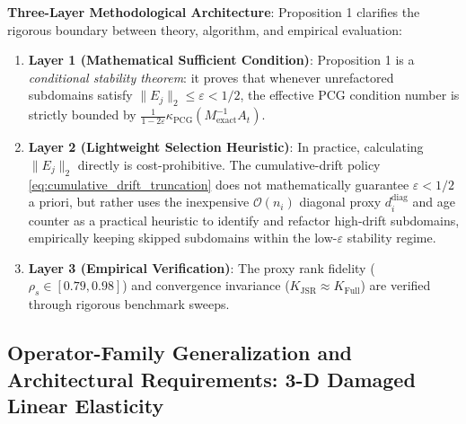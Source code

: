 \documentclass[preprint,12pt,3p]{elsarticle}
\begin{document}
\noindent\textbf{Three-Layer Methodological Architecture}:
Proposition 1 clarifies the rigorous boundary between theory, algorithm, and empirical evaluation:
\begin{enumerate}
    \item \textbf{Layer 1 (Mathematical Sufficient Condition)}: Proposition 1 is a \textit{conditional stability theorem}: it proves that whenever unrefactored subdomains satisfy $\|E_j\|_2 \le \varepsilon < 1/2$, the effective PCG condition number is strictly bounded by $\frac{1}{1-2\varepsilon} \kappa_{\text{PCG}}(M_{\text{exact}}^{-1} A_t)$.
    \item \textbf{Layer 2 (Lightweight Selection Heuristic)}: In practice, calculating $\|E_j\|_2$ directly is cost-prohibitive. The cumulative-drift policy \eqref{eq:cumulative_drift_truncation} does not mathematically guarantee $\varepsilon < 1/2$ a priori, but rather uses the inexpensive $\mathcal{O}(n_i)$ diagonal proxy $d_i^{\text{diag}}$ and age counter as a practical heuristic to identify and refactor high-drift subdomains, empirically keeping skipped subdomains within the low-$\varepsilon$ stability regime.
    \item \textbf{Layer 3 (Empirical Verification)}: The proxy rank fidelity ($\rho_s \in [0.79, 0.98]$) and convergence invariance ($K_{\text{JSR}} \approx K_{\text{Full}}$) are verified through rigorous benchmark sweeps.
\end{enumerate}

\subsection{Operator-Family Generalization and Architectural Requirements: 3-D Damaged Linear Elasticity}
\label{subsec:elasticity_generalization}
\end{document}
